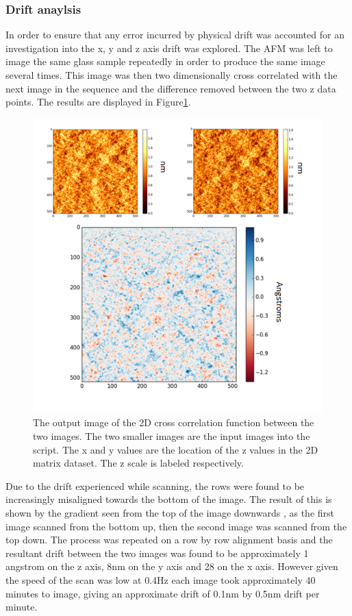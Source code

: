 \subsubsection{Drift anaylsis}

In order to ensure that any error incurred by physical drift was accounted for an investigation into the x, y and z axis drift was explored. The AFM was left to image the same glass sample repeatedly in order to produce the same image several times. This image was then two dimensionally cross correlated with the next image in the sequence and the difference removed between the two z data points. The results are displayed in Figure\ref{fig:CrossCor}.

\begin{figure}[h]     %
        \begin{center}
          \includegraphics[width=120mm]{chapter3/CrossCor.png}
\end{center}
\caption{The output image of the 2D cross correlation function between the two images. The two smaller images are the input images into the script. The x and y values are the location of the z values in the 2D matrix dataset. The z scale is labeled respectively.}
\label{fig:CrossCor}                 %
\end{figure}

Due to the drift experienced while scanning, the rows were found to be increasingly misaligned towards the bottom of the image. The result of this is shown by the gradient seen from the top of the image downwards , as the first image scanned from the bottom up, then the second image was scanned from the top down. The process was repeated on a row by row alignment basis and the resultant drift between the two images was found to be approximately 1 angstrom on the z axis, 8nm on the y axis and 28 on the x axis. However given the speed of the scan was low at 0.4Hz each image took approximately 40 minutes to image, giving an approximate drift of 0.1nm by 0.5nm drift per minute.

